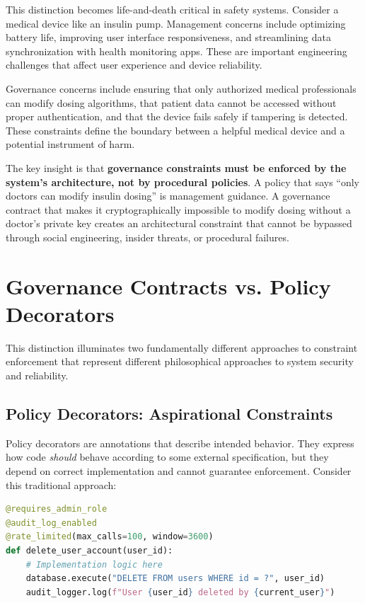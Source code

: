 This distinction becomes life-and-death critical in safety systems. Consider a medical device like an insulin pump. Management concerns include optimizing battery life, improving user interface responsiveness, and streamlining data synchronization with health monitoring apps. These are important engineering challenges that affect user experience and device reliability.

Governance concerns include ensuring that only authorized medical professionals can modify dosing algorithms, that patient data cannot be accessed without proper authentication, and that the device fails safely if tampering is detected. These constraints define the boundary between a helpful medical device and a potential instrument of harm.

The key insight is that \textbf{governance constraints must be enforced by the system's architecture, not by procedural policies}. A policy that says ``only doctors can modify insulin dosing'' is management guidance. A governance contract that makes it cryptographically impossible to modify dosing without a doctor's private key creates an architectural constraint that cannot be bypassed through social engineering, insider threats, or procedural failures.

\section{Governance Contracts vs. Policy Decorators}

This distinction illuminates two fundamentally different approaches to constraint enforcement that represent different philosophical approaches to system security and reliability.

\subsection{Policy Decorators: Aspirational Constraints}

Policy decorators are annotations that describe intended behavior. They express how code \textit{should} behave according to some external specification, but they depend on correct implementation and cannot guarantee enforcement. Consider this traditional approach:

\begin{lstlisting}[language=Python, caption=Traditional Policy Decorator Approach]
@requires_admin_role
@audit_log_enabled
@rate_limited(max_calls=100, window=3600)
def delete_user_account(user_id):
    # Implementation logic here
    database.execute("DELETE FROM users WHERE id = ?", user_id)
    audit_logger.log(f"User {user_id} deleted by {current_user}")
\end{lstlisting}

